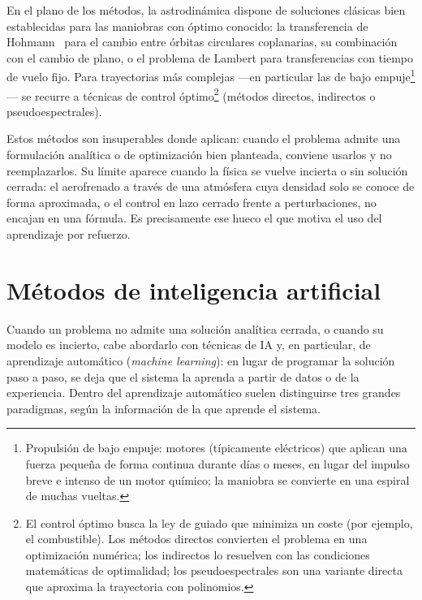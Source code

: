 {En el plano de los métodos, la astrodinámica dispone de soluciones clásicas bien establecidas para las maniobras con óptimo conocido: la transferencia de Hohmann~\cite{curtis2020,vallado2013} para el cambio entre órbitas circulares coplanarias, su combinación con el cambio de plano, o el problema de Lambert para transferencias con tiempo de vuelo fijo. Para trayectorias más complejas ---en particular las de bajo empuje\footnote{Propulsión de bajo empuje: motores (típicamente eléctricos) que aplican una fuerza pequeña de forma continua durante días o meses, en lugar del impulso breve e intenso de un motor químico; la maniobra se convierte en una espiral de muchas vueltas.}--- se recurre a técnicas de control óptimo\footnote{El control óptimo busca la ley de guiado que minimiza un coste (por ejemplo, el combustible). Los métodos directos convierten el problema en una optimización numérica; los indirectos lo resuelven con las condiciones matemáticas de optimalidad; los pseudoespectrales son una variante directa que aproxima la trayectoria con polinomios.} (métodos directos, indirectos o pseudoespectrales).

Estos métodos son insuperables donde aplican: cuando el problema admite una formulación analítica o de optimización bien planteada, conviene usarlos y no reemplazarlos. Su límite aparece cuando la física se vuelve incierta o sin solución cerrada: el aerofrenado a través de una atmósfera cuya densidad solo se conoce de forma aproximada, o el control en lazo cerrado frente a perturbaciones, no encajan en una fórmula. Es precisamente ese hueco el que motiva el uso del aprendizaje por refuerzo.

\section{Métodos de inteligencia artificial}
\label{sec:mot-ia}

Cuando un problema no admite una solución analítica cerrada, o cuando su modelo es incierto, cabe abordarlo con técnicas de \gls{IA} y, en particular, de aprendizaje automático (\textit{machine learning}): en lugar de programar la solución paso a paso, se deja que el sistema la aprenda a partir de datos o de la experiencia. Dentro del aprendizaje automático suelen distinguirse tres grandes paradigmas, según la información de la que aprende el sistema.

}
